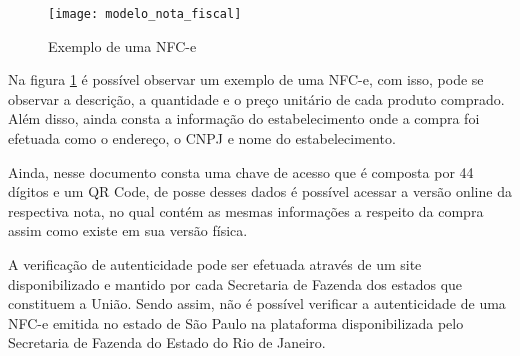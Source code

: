 \begin{figure}[h]
    \centering
    \texttt{[image: modelo\_nota\_fiscal]}
    \caption{Exemplo de uma NFC-e}
    \label{modeloNfce}
\end{figure}

Na figura \ref{modeloNfce} é possível observar um exemplo de uma NFC-e, com isso, pode se observar a descrição, a quantidade e o preço unitário de cada produto comprado. Além disso, ainda consta a informação do estabelecimento onde a compra foi efetuada como o endereço, o CNPJ e nome do estabelecimento.

Ainda, nesse documento consta uma chave de acesso que é composta por 44 dígitos e um QR Code, de posse desses dados é possível acessar a versão online da respectiva nota, no qual contém as mesmas informações a respeito da compra assim como existe em sua versão física.


A verificação de autenticidade pode ser efetuada através de um site disponibilizado e mantido por cada Secretaria de Fazenda dos estados que constituem a União. Sendo assim, não é possível verificar a autenticidade de uma NFC-e emitida no estado de São Paulo na plataforma disponibilizada pelo Secretaria de Fazenda do Estado do Rio de Janeiro.